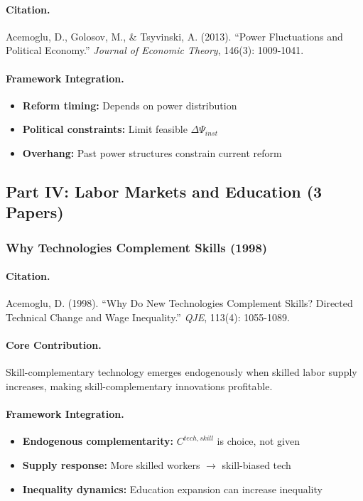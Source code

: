 \paragraph{Citation.}
Acemoglu, D., Golosov, M., \& Tsyvinski, A. (2013).
``Power Fluctuations and Political Economy.''
\emph{Journal of Economic Theory}, 146(3): 1009-1041.

\paragraph{Framework Integration.}
\begin{itemize}
  \item \textbf{Reform timing:} Depends on power distribution
  \item \textbf{Political constraints:} Limit feasible $\Delta\Psi_{inst}$
  \item \textbf{Overhang:} Past power structures constrain current reform
\end{itemize}

\subsection{Part IV: Labor Markets and Education (3 Papers)}

\subsubsection{Why Technologies Complement Skills (1998)}

\paragraph{Citation.}
Acemoglu, D. (1998). ``Why Do New Technologies Complement Skills?
Directed Technical Change and Wage Inequality.'' \emph{QJE}, 113(4): 1055-1089.

\paragraph{Core Contribution.}
Skill-complementary technology emerges endogenously when skilled labor
supply increases, making skill-complementary innovations profitable.

\paragraph{Framework Integration.}
\begin{itemize}
  \item \textbf{Endogenous complementarity:} $C^{tech,skill}$ is choice, not given
  \item \textbf{Supply response:} More skilled workers $\to$ skill-biased tech
  \item \textbf{Inequality dynamics:} Education expansion can increase inequality
\end{itemize}

